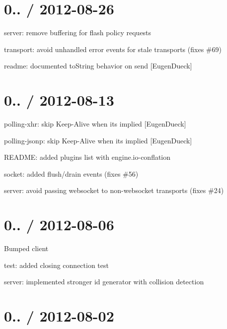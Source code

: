 \section*{0.. / 2012-\/08-\/26 }


\begin{DoxyItemize}
\item server\+: remove buffering for flash policy requests
\item transport\+: avoid unhandled error events for stale transports (fixes \#69)
\item readme\+: documented {\ttfamily to\+String} behavior on {\ttfamily send} \mbox{[}Eugen\+Dueck\mbox{]}
\end{DoxyItemize}

\section*{0.. / 2012-\/08-\/13 }


\begin{DoxyItemize}
\item polling-\/xhr\+: skip Keep-\/\+Alive when it\textquotesingle{}s implied \mbox{[}Eugen\+Dueck\mbox{]}
\item polling-\/jsonp\+: skip Keep-\/\+Alive when it\textquotesingle{}s implied \mbox{[}Eugen\+Dueck\mbox{]}
\item R\+E\+A\+D\+ME\+: added plugins list with engine.\+io-\/conflation
\item socket\+: added flush/drain events (fixes \#56)
\item server\+: avoid passing websocket to non-\/websocket transports (fixes \#24)
\end{DoxyItemize}

\section*{0.. / 2012-\/08-\/06 }


\begin{DoxyItemize}
\item Bumped client
\item test\+: added closing connection test
\item server\+: implemented stronger id generator with collision detection
\end{DoxyItemize}

\section*{0.. / 2012-\/08-\/02 }



